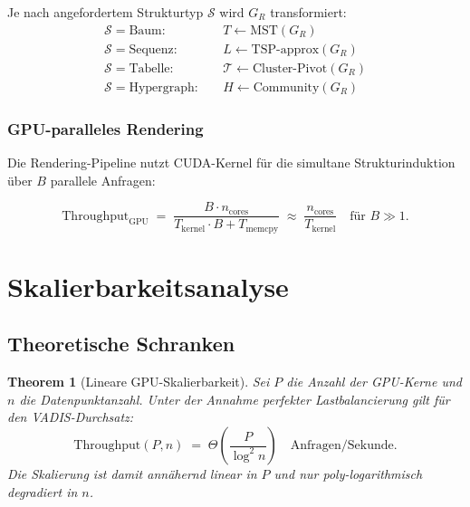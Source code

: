 ﻿\documentclass[12pt,a4paper]{article}
\newtheorem{theorem}{Theorem}[section]
\begin{document}
Je nach angefordertem Strukturtyp $\mathcal{S}$ wird $G_R$ transformiert:
\begin{align}
  \mathcal{S} = \text{Baum}:&\quad T \gets \text{MST}(G_R)\\
  \mathcal{S} = \text{Sequenz}:&\quad L \gets \text{TSP-approx}(G_R)\\
  \mathcal{S} = \text{Tabelle}:&\quad \mathcal{T} \gets \text{Cluster-Pivot}(G_R)\\
  \mathcal{S} = \text{Hypergraph}:&\quad H \gets \text{Community}(G_R)
\end{align}

\subsubsection{GPU-paralleles Rendering}

Die Rendering-Pipeline nutzt CUDA-Kernel für die simultane 
Strukturinduktion über $B$ parallele Anfragen:

\begin{equation}
  \text{Throughput}_{\text{GPU}} \;=\; \frac{B \cdot n_{\text{cores}}}
    {T_{\text{kernel}} \cdot B + T_{\text{memcpy}}}
  \;\approx\; \frac{n_{\text{cores}}}{T_{\text{kernel}}}
  \quad \text{für } B \gg 1.
\end{equation}

\section{Skalierbarkeitsanalyse}
\label{sec:skalierung}

\subsection{Theoretische Schranken}

\begin{theorem}[Lineare GPU-Skalierbarkeit]
\label{thm:gpuscale}
Sei $P$ die Anzahl der GPU-Kerne und $n$ die Datenpunktanzahl. 
Unter der Annahme perfekter Lastbalancierung gilt für den 
VADIS-Durchsatz:
\[
  \text{Throughput}(P, n) \;=\; \Theta\!\left(\frac{P}{\log^2 n}\right)
  \quad \text{Anfragen/Sekunde}.
\]
Die Skalierung ist damit annähernd \emph{linear} in $P$ und nur 
\emph{poly-logarithmisch} degradiert in $n$.
\end{theorem}
\end{document}
